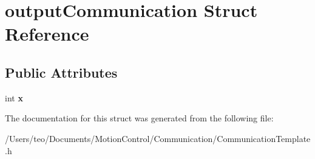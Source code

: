 \hypertarget{structoutput_communication}{}\section{output\+Communication Struct Reference}
\label{structoutput_communication}
\subsection*{Public Attributes}
\begin{DoxyCompactItemize}
\item 
\mbox{\label{structoutput_communication_ae41a2a65c41fee260a8ab8c59e189ee8}} 
int {\bfseries x}
\end{DoxyCompactItemize}


The documentation for this struct was generated from the following file\+:\begin{DoxyCompactItemize}
\item 
/\+Users/teo/\+Documents/\+Motion\+Control/\+Communication/Communication\+Template.\+h\end{DoxyCompactItemize}
